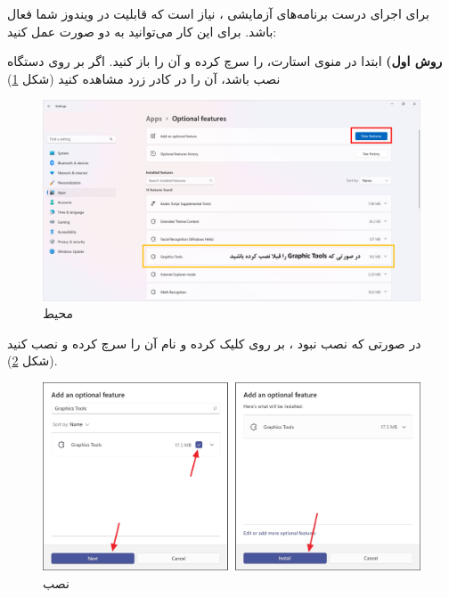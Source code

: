 {
    \Large
    \begin{spacing}{1.5}
        برای اجرای درست برنامه‌های آزمایشی ، نیاز است که قابلیت  در ویندوز شما فعال باشد.
        برای این کار می‌توانید به دو صورت عمل کنید:

        \textbf{روش اول)}
        ابتدا در منوی استارت،  را سرچ کرده و آن را باز کنید.
        اگر  بر روی دستگاه نصب باشد، آن را در کادر زرد مشاهده کنید (شکل \ref{fig:3.Intro.4.1})

        \begin{figure}[H]
            \centering
            \setlength{\belowcaptionskip}{-10pt}
            \includegraphics[width=\textwidth]{Images/3/3.Intro.4.1}
            \caption{محیط }
            \label{fig:3.Intro.4.1}
        \end{figure}

        در صورتی که نصب نبود ، بر روی  کلیک کرده و نام آن را سرچ کرده و نصب کنید (شکل \ref{fig:3.Intro.4.2}).

        \begin{figure}[H]
            \centering
            \setlength{\belowcaptionskip}{-10pt}
            \includegraphics[width=\textwidth]{Images/3/3.Intro.4.2}
            \caption{نصب }
            \label{fig:3.Intro.4.2}
        \end{figure}


\end{spacing}}
